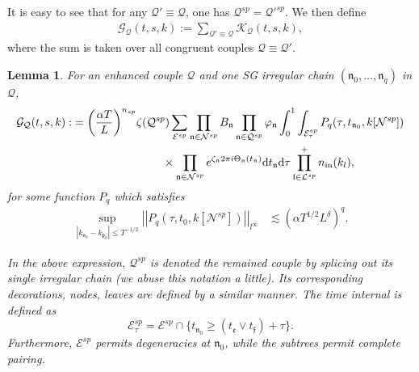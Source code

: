 \documentclass[UTF-8,reqno]{amsart}
\numberwithin{equation}{section}
\newtheorem{lemma}[theorem]{Lemma}
\theoremstyle{definition}
\def\dif{{\mathord{{\rm d}}}}
\def\geq{\geqslant}
\def\leq{\leqslant}
\def\dif{{\mathord{{\rm d}}}}
\def\geq{\geqslant}
\def\leq{\leqslant}
\begin{document}
 It is easy to see that for any $\mathcal{Q}'\equiv\mathcal{Q}$, one has $\mathcal{Q}^{sp}=\mathcal{Q}'^{sp}$.
We then define 
 \begin{align}
     \mathcal{G}_\mathcal{Q}(t,s,k):=\sum_{\mathcal{Q}'\equiv\mathcal{Q}}\mathcal{K}_\mathcal{Q}(t,s,k),\label{def:gq}
 \end{align}
 where the sum is taken over all congruent couples $\mathcal{Q}\equiv\mathcal{Q}'$.  
\begin{lemma}\label{lem-splice}
For an enhanced couple $\mathcal Q$ and one SG irregular chain $(\mathfrak n_0, \ldots, \mathfrak n_{q})$ in $\mathcal{Q}$, 
\begin{align*}
    \mathcal{G}_\mathcal{Q}(t,s,k) :&= \bigg(\frac{\alpha T}{L}\bigg)^{n_{sp}} \zeta(\mathcal{Q}^{sp}) \sum_{\mathcal{E}^{sp}}  %
    \prod_{\mathfrak{n}\in\mathcal{N}^{sp}}B_\mathfrak{n}\prod_{\mathfrak{n}\in\mathcal{Q}^{sp}}\varphi_\mathfrak{n}
\int_0^1\int_{\mathcal{E}^{sp}_\tau} P_q(\tau, t_{\mathfrak n_0}, k[\mathcal N^{sp}])\\
&\quad\quad\quad\quad\quad\quad\quad\quad\times\prod_{\mathfrak{n}\in\mathcal{N}^{sp}}  e^{\zeta_\mathfrak{n}2\pi i\Theta_\mathfrak{n}(t_\mathfrak{n}) } \dif t_\mathfrak{n}\dif \tau
\prod_{\mathfrak{l} \in \mathcal{L}^{sp}}^+ n_{\rm in}(k_l),
\end{align*}
 for some function  $P_q$ which satisfies 
\begin{align}
\sup_{|k_{\mathfrak n_0} - k_{\mathfrak p_0}| \leq T^{-1/2}} \left|\left|P_q(\tau,t_0,  k[\mathcal N^{sp}])\right|\right|_{l^\infty} &\lesssim \left(\alpha T^{1/2}L^\delta\right)^q.\label{eq-pestimate}
\end{align}

In the above expression,  $\mathcal{Q}^{sp}$ is denoted 
the remained couple   by splicing out its single irregular chain (we abuse this notation a little). Its corresponding decorations, nodes, leaves are defined by a similar manner. The time internal is defined as 
\begin{equation}\label{eq-sig-setE}
\mathcal E^{sp}_{\tau} = \mathcal E^{sp} \cap \{ t_{\mathfrak n_0} \geq (t_{\mathfrak e}\vee t_{\mathfrak f} )+ \tau \}.
\end{equation}
Furthermore, $%
{\mathcal{E}^{sp}}$ permits degeneracies at $\mathfrak{n}_0$, while the subtrees permit complete pairing.
\end{lemma}
\end{document}
